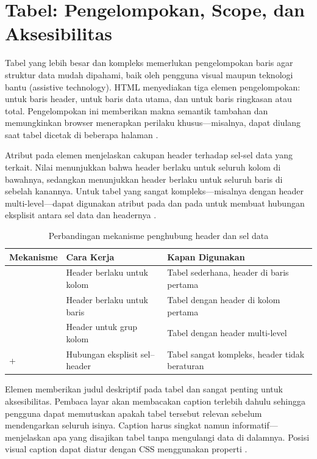 ﻿\section{Tabel: Pengelompokan, Scope, dan Aksesibilitas}

Tabel yang lebih besar dan kompleks memerlukan pengelompokan baris agar struktur data mudah dipahami, baik oleh pengguna visual maupun teknologi bantu (assistive technology). HTML menyediakan tiga elemen pengelompokan:  untuk baris header,  untuk baris data utama, dan  untuk baris ringkasan atau total. Pengelompokan ini memberikan makna semantik tambahan dan memungkinkan browser menerapkan perilaku khusus---misalnya,  dapat diulang saat tabel dicetak di beberapa halaman \cite{mdnHtmlIntro}.

Atribut  pada elemen  menjelaskan cakupan header terhadap sel-sel data yang terkait. Nilai  menunjukkan bahwa header berlaku untuk seluruh kolom di bawahnya, sedangkan  menunjukkan header berlaku untuk seluruh baris di sebelah kanannya. Untuk tabel yang sangat kompleks---misalnya dengan header multi-level---dapat digunakan atribut  pada  dan  pada  untuk membuat hubungan eksplisit antara sel data dan headernya \cite{mdnAccessibility}.

\begin{table}[H]
\centering
\begin{tabular}{|P{3.5cm}|P{4cm}|P{4.5cm}|}
\hline
\textbf{Mekanisme} & \textbf{Cara Kerja} & \textbf{Kapan Digunakan} \\
\hline
{} & Header berlaku untuk kolom & Tabel sederhana, header di baris pertama \\
\hline
{} & Header berlaku untuk baris & Tabel dengan header di kolom pertama \\
\hline
{} & Header untuk grup kolom & Tabel dengan header multi-level \\
\hline
{} +  & Hubungan eksplisit sel--header & Tabel sangat kompleks, header tidak beraturan \\
\hline
\end{tabular}
\caption{Perbandingan mekanisme penghubung header dan sel data}
\end{table}

Elemen  memberikan judul deskriptif pada tabel dan sangat penting untuk aksesibilitas. Pembaca layar akan membacakan caption terlebih dahulu sehingga pengguna dapat memutuskan apakah tabel tersebut relevan sebelum mendengarkan seluruh isinya. Caption harus singkat namun informatif---menjelaskan apa yang disajikan tabel tanpa mengulangi data di dalamnya. Posisi visual caption dapat diatur dengan CSS menggunakan properti  \cite{webdevAccessibility}.

